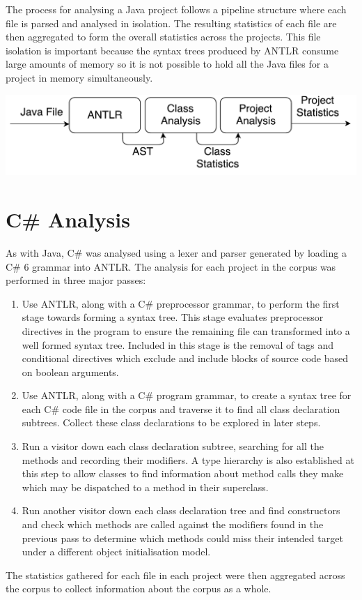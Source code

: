 The process for analysing a Java project follows a pipeline structure where each file is parsed and analysed in isolation. The resulting statistics of each file are then aggregated to form the overall statistics across the projects. This file isolation is important because the syntax trees produced by ANTLR consume large amounts of memory so it is not possible to hold all the Java files for a project in memory simultaneously.
\newline

\begin{center}
	\includegraphics[scale=0.70]{AntlrPipeline.pdf}
\end{center}

\section{C\# Analysis}
As with Java, C\# was analysed using a lexer and parser generated by loading a C\# 6 grammar into ANTLR. The analysis for each project in the corpus was performed in three major passes:
\begin{enumerate}
	\item Use ANTLR, along with a C\# preprocessor grammar, to perform the first stage towards forming a syntax tree. This stage evaluates preprocessor directives in the program to ensure the remaining file can transformed into a well formed syntax tree. Included in this stage is the removal of  tags and conditional directives which exclude and include blocks of source code based on boolean arguments.
	\item Use ANTLR, along with a C\# program grammar, to create a syntax tree for each C\# code file in the corpus and traverse it to find all class declaration subtrees. Collect these class declarations to be explored in later steps.
	\item Run a visitor down each class declaration subtree, searching for all the methods and recording their modifiers. A type hierarchy is also established at this step to allow classes to find information about method calls they make which may be dispatched to a method in their superclass.
	\item Run another visitor down each class declaration tree and find constructors and check which methods are called against the modifiers found in the previous pass to determine which methods could miss their intended target under a different object initialisation model.
\end{enumerate}
The statistics gathered for each file in each project were then aggregated across the corpus to collect information about the corpus as a whole.

